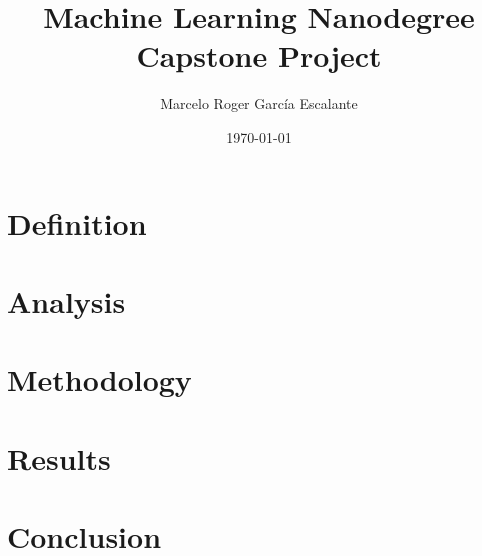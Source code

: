 \documentclass[a4paper]{article}
\title{Machine Learning Nanodegree  \linebreak Capstone Project}
\author{Marcelo Roger García Escalante}
\date{\today}
\begin{document}
\maketitle

\section{Definition}



\section{Analysis}
\label{sec:analysis}


\section{Methodology}


\section{Results}


\section{Conclusion}



\vspace*{1cm}


\end{document}
